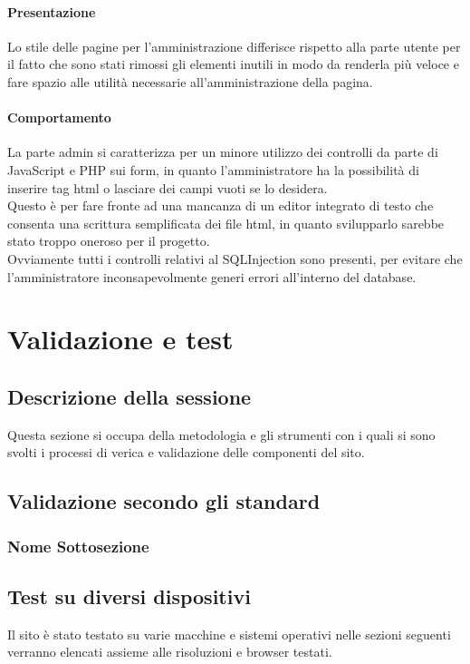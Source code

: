 \documentclass[openany, a4paper, 12pt]{report}
\begin{document}
		\subsubsection{Presentazione}
		Lo stile delle pagine per l'amministrazione differisce rispetto alla parte utente per il fatto che sono stati rimossi gli elementi inutili in modo da renderla più veloce e fare spazio alle utilità necessarie all'amministrazione della pagina.
		\subsubsection{Comportamento}
		La parte admin si caratterizza per un minore utilizzo dei controlli da parte di JavaScript e PHP sui form, in quanto l'amministratore ha la possibilità di inserire tag html o lasciare dei campi vuoti se lo desidera.\\
		Questo è per fare fronte ad una mancanza di un editor integrato di testo che consenta una scrittura semplificata dei file html, in quanto svilupparlo sarebbe stato troppo oneroso per il progetto.\\
		Ovviamente tutti i controlli relativi al SQLInjection sono presenti, per evitare che l'amministratore inconsapevolmente generi errori all'interno del database.
	
	\chapter{Validazione e test}
		\section{Descrizione della sessione}
			Questa sezione si occupa della metodologia e gli strumenti con i quali si sono svolti i processi di verica e validazione delle componenti del sito.
		\section{Validazione secondo gli standard}
			\subsection{Nome Sottosezione}
		\section{Test su diversi dispositivi}
			Il sito è stato testato su varie macchine e sistemi operativi nelle sezioni seguenti verranno elencati assieme alle risoluzioni e browser testati.
\end{document}
